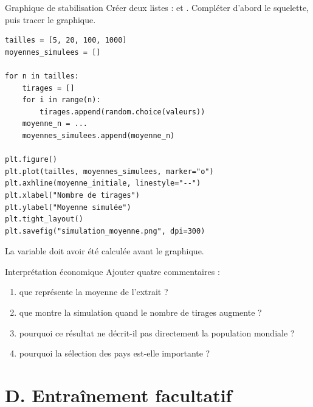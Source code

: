 \documentclass[11pt,a4paper]{article}
\begin{document}
\begin{mandatoryexercise}{Graphique de stabilisation}
Créer deux listes :  et . Compléter d'abord le squelette, puis tracer le graphique.
\begin{lstlisting}
tailles = [5, 20, 100, 1000]
moyennes_simulees = []

for n in tailles:
    tirages = []
    for i in range(n):
        tirages.append(random.choice(valeurs))
    moyenne_n = ...
    moyennes_simulees.append(moyenne_n)

plt.figure()
plt.plot(tailles, moyennes_simulees, marker="o")
plt.axhline(moyenne_initiale, linestyle="--")
plt.xlabel("Nombre de tirages")
plt.ylabel("Moyenne simulée")
plt.tight_layout()
plt.savefig("simulation_moyenne.png", dpi=300)
\end{lstlisting}
La variable  doit avoir été calculée avant le graphique.
\end{mandatoryexercise}

\begin{mandatoryexercise}{Interprétation économique}
Ajouter quatre commentaires :
\begin{enumerate}
  \item que représente la moyenne de l'extrait ?
  \item que montre la simulation quand le nombre de tirages augmente ?
  \item pourquoi ce résultat ne décrit-il pas directement la population mondiale ?
  \item pourquoi la sélection des pays est-elle importante ?
\end{enumerate}
\end{mandatoryexercise}

\section*{D. Entraînement facultatif}
\end{document}
